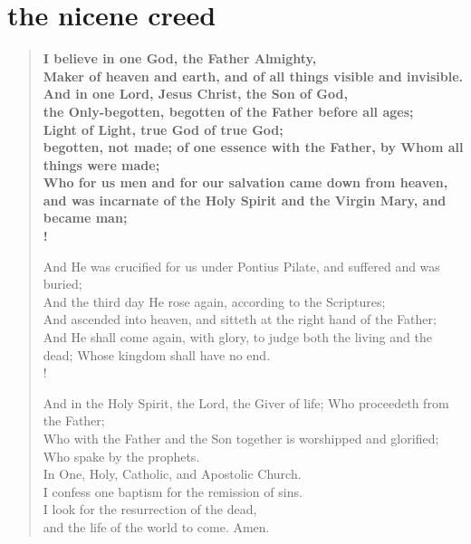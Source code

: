 \section{the nicene creed}

\begin{verse}
    \bfseries I believe in one God, the Father Almighty, \\
    Maker of heaven and earth, and of all things visible and invisible. \\
    And in one Lord, Jesus Christ, the Son of God, \\
    the Only-begotten, begotten of the Father before all ages; \\
    Light of Light, true God of true God; \\
    begotten, not made; of one essence with the Father, by Whom all things were made; \\
    Who for us men and for our salvation came down from heaven, \\
    and was incarnate of the Holy Spirit and the Virgin Mary, \verselinebreak and became man; \\!

    And He was crucified for us under Pontius Pilate, and suffered \verselinebreak and was buried; \\
    And the third day He rose again, according to the Scriptures; \\
    And ascended into heaven, and sitteth at the right hand of the Father; \\
    And He shall come again, with glory, to judge both the living and the dead; Whose kingdom shall have no end. \\!

    And in the Holy Spirit, the Lord, the Giver of life; Who proceedeth from the Father; \\
    Who with the Father and the Son together is worshipped and glorified; Who spake by the prophets. \\
    In One, Holy, Catholic, and Apostolic Church. \\
    I confess one baptism for the remission of sins. \\
    I look for the resurrection of the dead, \\
    and the life of the world to come. Amen.
\end{verse}